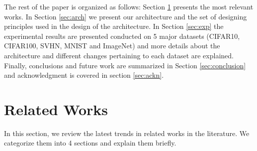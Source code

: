 \documentclass{article} \usepackage{lets_keepit_simple,times}
\begin{document}
The rest of the paper is organized as follows: Section \ref{sec:related} presents the most relevant works. In Section \ref{sec:arch} we present our architecture and the set of designing principles used in the design of the architecture. In Section \ref{sec:exp} the experimental results are presented conducted on 5 major datasets (CIFAR10, CIFAR100, SVHN, MNIST and ImageNet) and more details about the architecture and different changes pertaining to each dataset are explained. Finally, conclusions and future work are summarized in Section \ref{sec:conclusion} and acknowledgment is covered in section \ref{sec:ackn}.
\section{Related Works} \label{sec:related}
In this section, we review the latest trends in related works in the literature. We categorize them into 4 sections and explain them briefly. 
\end{document}
